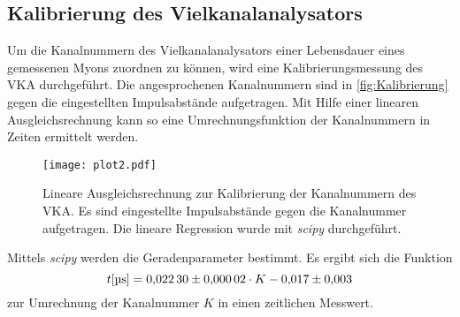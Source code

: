 \subsection{Kalibrierung des Vielkanalanalysators}
Um die Kanalnummern des Vielkanalanalysators einer Lebensdauer eines gemessenen Myons zuordnen zu können, wird eine Kalibrierungsmessung des VKA durchgeführt.
Die angesprochenen Kanalnummern sind in \autoref{fig:Kalibrierung} gegen die eingestellten Impulsabstände aufgetragen. Mit Hilfe einer linearen Ausgleichsrechnung
kann so eine Umrechnungsfunktion der Kanalnummern in Zeiten ermittelt werden. 
\begin{figure}
  \centering
  \texttt{[image: plot2.pdf]}
  \caption{Lineare Ausgleichsrechnung zur Kalibrierung der Kanalnummern des VKA. 
  Es sind eingestellte Impulsabstände gegen die Kanalnummer aufgetragen. Die lineare Regression wurde mit \textit{scipy} \cite{scipy} durchgeführt.}
  \label{fig:Kalibrierung}
\end{figure}
Mittels \textit{scipy} \cite{scipy} werden die Geradenparameter bestimmt. Es ergibt sich die Funktion
\begin{equation*}
  t [\unit{\micro\second}] = \num{0.0223 +- 0.00002} \cdot K - \num{0.017 \pm 0.003}
\end{equation*}
zur Umrechnung der Kanalnummer $K$ in einen zeitlichen Messwert.

